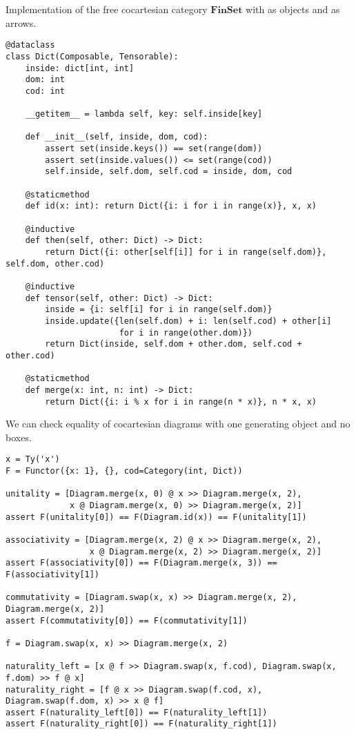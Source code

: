 \begin{python}
Implementation of the free cocartesian category $\mathbf{FinSet}$ with  as objects and  as arrows.

\begin{verbatim}
@dataclass
class Dict(Composable, Tensorable):
    inside: dict[int, int]
    dom: int
    cod: int

    __getitem__ = lambda self, key: self.inside[key]

    def __init__(self, inside, dom, cod):
        assert set(inside.keys()) == set(range(dom))
        assert set(inside.values()) <= set(range(cod))
        self.inside, self.dom, self.cod = inside, dom, cod

    @staticmethod
    def id(x: int): return Dict({i: i for i in range(x)}, x, x)

    @inductive
    def then(self, other: Dict) -> Dict:
        return Dict({i: other[self[i]] for i in range(self.dom)}, self.dom, other.cod)

    @inductive
    def tensor(self, other: Dict) -> Dict:
        inside = {i: self[i] for i in range(self.dom)}
        inside.update({len(self.dom) + i: len(self.cod) + other[i]
                       for i in range(other.dom)})
        return Dict(inside, self.dom + other.dom, self.cod + other.cod)

    @staticmethod
    def merge(x: int, n: int) -> Dict:
        return Dict({i: i % x for i in range(n * x)}, n * x, x)
\end{verbatim}
\end{python}

\begin{example}
We can check equality of cocartesian diagrams with one generating object and no boxes.

\begin{verbatim}
x = Ty('x')
F = Functor({x: 1}, {}, cod=Category(int, Dict))

unitality = [Diagram.merge(x, 0) @ x >> Diagram.merge(x, 2),
             x @ Diagram.merge(x, 0) >> Diagram.merge(x, 2)]
assert F(unitality[0]) == F(Diagram.id(x)) == F(unitality[1])

associativity = [Diagram.merge(x, 2) @ x >> Diagram.merge(x, 2),
                 x @ Diagram.merge(x, 2) >> Diagram.merge(x, 2)]
assert F(associativity[0]) == F(Diagram.merge(x, 3)) == F(associativity[1])

commutativity = [Diagram.swap(x, x) >> Diagram.merge(x, 2), Diagram.merge(x, 2)]
assert F(commutativity[0]) == F(commutativity[1])

f = Diagram.swap(x, x) >> Diagram.merge(x, 2)

naturality_left = [x @ f >> Diagram.swap(x, f.cod), Diagram.swap(x, f.dom) >> f @ x]
naturality_right = [f @ x >> Diagram.swap(f.cod, x), Diagram.swap(f.dom, x) >> x @ f]
assert F(naturality_left[0]) == F(naturality_left[1])
assert F(naturality_right[0]) == F(naturality_right[1])
\end{verbatim}
\end{example}

